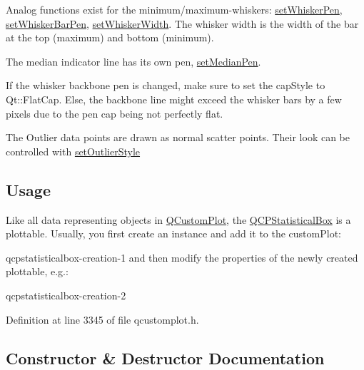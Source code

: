 Analog functions exist for the minimum/maximum-\/whiskers\+: \hyperlink{class_q_c_p_statistical_box_a4a5034cb3b9b040444df05ab1684620b}{set\+Whisker\+Pen}, \hyperlink{class_q_c_p_statistical_box_aa8d3e503897788e1abf68dc74b5f147f}{set\+Whisker\+Bar\+Pen}, \hyperlink{class_q_c_p_statistical_box_adf378812446bd66f34d1f7f293d991cd}{set\+Whisker\+Width}. The whisker width is the width of the bar at the top (maximum) and bottom (minimum).

The median indicator line has its own pen, \hyperlink{class_q_c_p_statistical_box_a7260ac55b669f5d0a74f16d5ca84c52c}{set\+Median\+Pen}.

If the whisker backbone pen is changed, make sure to set the cap\+Style to Qt\+::\+Flat\+Cap. Else, the backbone line might exceed the whisker bars by a few pixels due to the pen cap being not perfectly flat.

The Outlier data points are drawn as normal scatter points. Their look can be controlled with \hyperlink{class_q_c_p_statistical_box_ad5241943422eb8e58360a97e99ad6aa7}{set\+Outlier\+Style}\hypertarget{class_q_c_p_statistical_box_usage}{}\subsection{Usage}\label{class_q_c_p_statistical_box_usage}
Like all data representing objects in \hyperlink{class_q_custom_plot}{Q\+Custom\+Plot}, the \hyperlink{class_q_c_p_statistical_box}{Q\+C\+P\+Statistical\+Box} is a plottable. Usually, you first create an instance and add it to the custom\+Plot\+: 
\begin{DoxyCodeInclude}
\end{DoxyCodeInclude}
qcpstatisticalbox-\/creation-\/1 and then modify the properties of the newly created plottable, e.\+g.\+: 
\begin{DoxyCodeInclude}
\end{DoxyCodeInclude}
qcpstatisticalbox-\/creation-\/2 

Definition at line 3345 of file qcustomplot.\+h.



\subsection{Constructor \& Destructor Documentation}
\hypertarget{class_q_c_p_statistical_box_a75c2b3e7fcd0741cc981693a2ba63b27}{}
